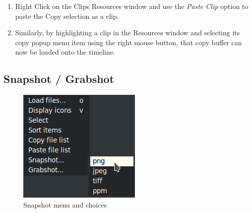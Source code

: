 \begin{enumerate}
    \item  Right Click on the Clips Resources window and use the \textit{Paste Clip} option to paste the Copy selection as a clip.  
    \item  Similarly, by highlighting a clip in the Resources window and selecting its copy popup menu item using the right mouse button, that copy buffer can now be loaded onto the timeline.
\end{enumerate}


\subsection{Snapshot / Grabshot}%
\label{sub:snapshot_grabshot}

\begin{figure}[htpb]
    \centering
    \begin{minipage}{.49\linewidth}
    \centering
    \includegraphics[width=0.8\linewidth]{images/snapshot.png}
    \caption{Snapshot menu and choices}
    \label{fig:snapshot}
    \end{minipage}
    \begin{minipage}{.49\linewidth}
    \centering
    \begin{tikzpicture}[scale=1, transform shape]

\end{tikzpicture}
\end{minipage}
\end{figure}
